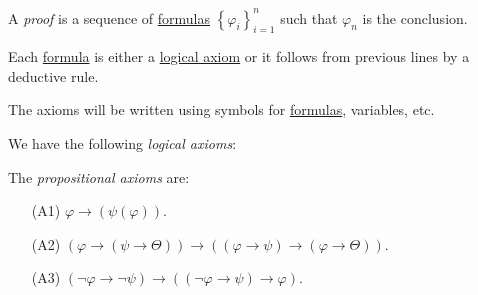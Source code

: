 \begin{definition}\label{def:Hilbert-style-deductive-system}
	\begin{definition}[Proof]\label{def:proof}
		A \emph{proof} is a sequence of \hyperref[def:formula]{formulas} \(\left\{ \varphi _i \right\} _{i=1}^n\) such that \(\varphi _n\) is the conclusion.
	\end{definition}
	Each \hyperref[def:formula]{formula} is either a \hyperref[def:logical-axiom]{logical axiom} or it follows from previous lines by a deductive rule.

	\begin{definition}[Schema]\label{def:schema}
		The axioms will be written using symbols for \hyperref[def:formula]{formulas}, variables, etc.
	\end{definition}

	\begin{definition}\label{def:logical-axioms}
		We have the following \emph{logical axioms}:
		\begin{definition}\label{def:propositional-axioms}
			The \emph{propositional axioms} are:
			\begin{enumerate}
				\item[(A1)] \(\varphi \to  (\psi (\varphi ))\).
				\item[(A2)] \((\varphi \to (\psi \to \Theta )) \to ((\varphi \to  \psi ) \to (\varphi \to \Theta ))\).
				\item[(A3)] \((\lnot \varphi \to \lnot \psi ) \to  ((\lnot \varphi \to \psi ) \to \varphi )\).
			\end{enumerate}
		\end{definition}


\end{definition}
\end{definition}
